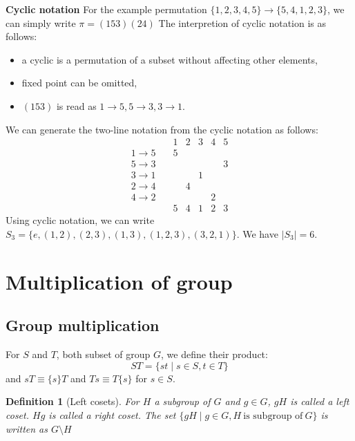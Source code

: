 \documentclass{amsart}
\newtheorem{definition}{Definition}
\begin{document}
\textbf{Cyclic notation}
For the example permutation $\{1,2,3,4,5\} \to \{ 5,4,1,2,3 \}$, we can simply write
$\pi = (153)(24)$
The interpretion of cyclic notation is as follows:
\begin{itemize}
    \item a cyclic is a permutation of a subset without affecting other elements,
    \item fixed point can be omitted,
    \item $(153)$ is read as $1\to 5, 5\to 3, 3\to 1$. 
\end{itemize}
We can generate the two-line notation from the cyclic notation as follows:
\begin{equation*}
    \begin{matrix}
                & 1 & 2 & 3 & 4 & 5 \\
        1 \to 5 \quad & 5 &   &   &   &   \\
        5 \to 3 \quad &   &   &   &   & 3 \\
        3 \to 1 \quad &   &   & 1 &   &   \\
        2 \to 4 \quad &   & 4 &   &   &   \\
        4 \to 2 \quad &   &   &   & 2 &   \\
                & 5 & 4 & 1 & 2 & 3
    \end{matrix}
\end{equation*}
Using cyclic notation, we can write $S_3 = \{ e, (1,2), (2,3), (1,3), (1,2,3), (3,2,1) \}$. We have $|S_3| = 6$. 

\section{Multiplication of group} 

\subsection*{Group multiplication}
For $S$ and $T$, both subset of group $G$, we define their product:
\begin{equation}
    ST = \{st\mid s\in S, t \in T\}
\end{equation}
and $sT \equiv \{s\}T $ and $Ts \equiv T\{s\} $ for $s \in S$.

\vspace{10pt}

\begin{definition}[Left cosets]
    For $H$ a subgroup of $G$ and $g \in G$, $gH$ is called a left coset. $Hg$ is called a right coset. 
    The set $\{gH \mid g \in G, H\ \text{is subgroup of}\ G\}$ is written as $G\setminus H$
\end{definition}
\end{document}
